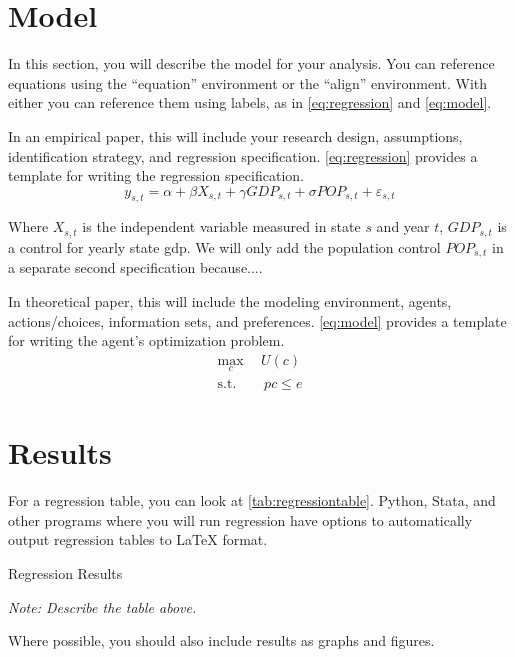 \documentclass[12pt]{article}
\begin{document}
\section{Model}
In this section, you will describe the model for your analysis. You can reference equations using the ``equation'' environment or the ``align'' environment. With either you can reference them using labels, as in \autoref{eq:regression} and \autoref{eq:model}.

 In an empirical paper, this will include your research design, assumptions, identification strategy, and regression specification. \autoref{eq:regression} provides a template for writing the regression specification.
\begin{equation}\label{eq:regression}
    y_{s,t} = \alpha +\beta X_{s,t} + \gamma GDP_{s,t} + \sigma POP_{s,t} +\varepsilon_{s,t}
\end{equation}

Where \(X_{s,t}\) is the independent variable measured in state \(s\) and year \(t\), \(GDP_{s,t}\) is a control for yearly state gdp. We will only add the population control \(POP_{s,t}\) in a separate second specification because....

 In theoretical paper, this will include the modeling environment, agents, actions/choices, information sets, and preferences. \autoref{eq:model} provides a template for writing the agent's optimization problem.
\begin{align}\label{eq:model}
    \max_c\ &\ U(c) \\
    \text{s.t.} &\ \ p c \leq e  \nonumber 
\end{align}


\section{Results}

For a regression table, you can look at \autoref{tab:regressiontable}. Python, Stata, and other programs where you will run regression have options to automatically output regression tables to LaTeX format. 

\begin{table}[ht]
    \centering
    \caption{Regression Results}
    \label{tab:regressiontable}
    
    \caption*{\footnotesize \textit{Note: Describe the table above.}}
\end{table}

Where possible, you should also include results as graphs and figures.
\end{document}
